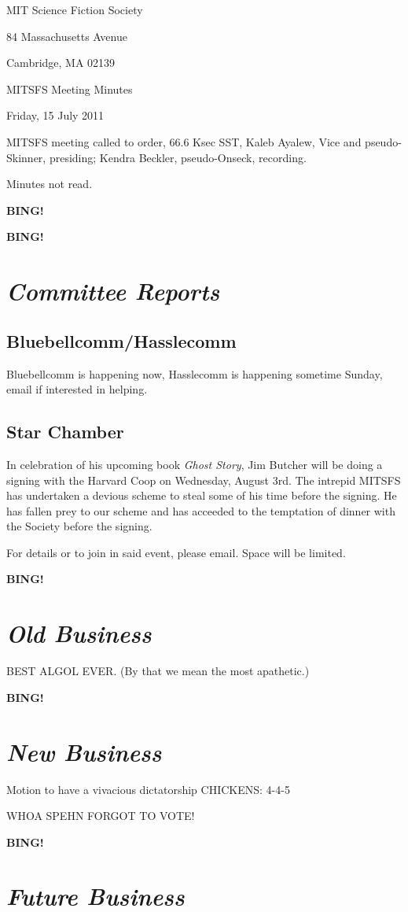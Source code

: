 \documentclass[10pt]{article}
\newcommand{\bing}{{\bf BING!} }
\newcommand{\goto}[1]{\bing \vskip 12pt \section*{{\em{#1}}}}
\newcommand{\skinner}{Kaleb Ayalew, Vice and pseudo-Skinner}
\newcommand{\onseck}{Kendra Beckler, pseudo-Onseck}
\newcommand{\meetingdate}{Friday, 15 July 2011}
\begin{document}
\begin{center}

MIT Science Fiction Society

84 Massachusetts Avenue

Cambridge, MA 02139

\vspace{12pt}

MITSFS Meeting Minutes

\meetingdate

\end{center}

\vspace{18pt}

\setlength{\parskip}{6pt}

\noindent
MITSFS meeting called to order, 66.6 Ksec SST,
\skinner, presiding; \onseck, recording.

Minutes not read.

\bing

\goto{Committee Reports}

\subsection*{Bluebellcomm/Hasslecomm}

Bluebellcomm is happening now, Hasslecomm is happening sometime Sunday, email if interested in helping.

\subsection*{Star Chamber}

In celebration of his upcoming book \textit{Ghost Story}, Jim Butcher will be doing a signing with the Harvard Coop on Wednesday, August 3rd.  The intrepid MITSFS has undertaken a devious scheme to steal some of his time before the signing.  He has fallen prey to our scheme and has acceeded to the temptation of dinner with the Society before the signing.

For details or to join in said event, please email.  Space will be limited.

\goto{Old Business}

BEST ALGOL EVER.  (By that we mean the most apathetic.)

\goto{New Business}

Motion to have a vivacious dictatorship CHICKENS: 4-4-5

WHOA SPEHN FORGOT TO VOTE!

\goto{Future Business}
\end{document}
